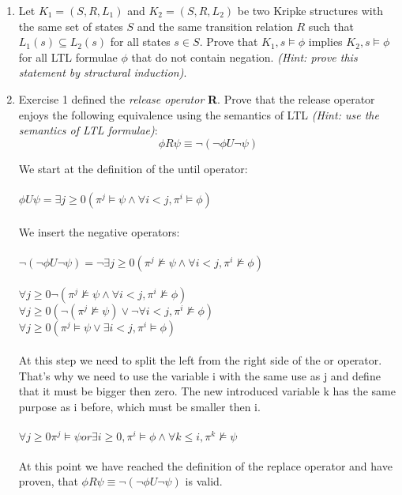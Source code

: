 
\begin{enumerate}

\item Let $K_1 = (S, R, L_1)$ and  $K_2 = (S, R, L_2)$ be two Kripke structures with the same set of states $S$ and the same transition relation $R$ such that $L_1(s) \subseteq L_2(s)$ for all states $s \in S$.
    Prove that $K_1,s \models \phi$ implies $K_2,s \models \phi$ for all LTL formulae $\phi$ that do not contain negation.
    \emph{(Hint: prove this statement by structural induction)}.

\item

Exercise 1 defined the \emph{release operator} \textbf{R}.
Prove that the release operator enjoys the following equivalence using the semantics of LTL \emph{(Hint: use the semantics of LTL formulae)}:
\begin{displaymath}
\phi R \psi \equiv \neg (\neg \phi U \neg \psi)
\end{displaymath}

We start at the definition of the until operator:\\
\\
$\phi U \psi = \exists j \geq 0 (\pi^{j} \vDash \psi \wedge \forall i<j, \pi^{i} \vDash \phi)$\\
\\
We insert the negative operators:\\
\\
$\neg (\neg \phi U \neg \psi) = \neg \exists j \geq 0 (\pi^{j} \nvDash \psi \wedge \forall i<j, \pi^{i} \nvDash \phi)$\\
\\
$\forall j \geq 0 \neg(\pi^{j} \nvDash \psi \wedge \forall i<j, \pi^{i} \nvDash \phi)$\\
$\forall j \geq 0 (\neg(\pi^{j} \nvDash \psi) \vee \neg\forall i<j, \pi^{i} \nvDash \phi)$\\
$\forall j \geq 0 (\pi^{j} \vDash \psi \vee \exists i<j, \pi^{i} \vDash \phi)$\\
\\
At this step we need to split the left from the right side of the or operator. That's why we need to use the variable i with the same use as j 
and define that it must be bigger then zero. The new introduced variable k has the same purpose as i before, which must be smaller then i.\\
\\
$\forall j \geq 0 \pi^{j} \vDash \psi 	or	 \exists i\geq 0, \pi^{i} \vDash \phi \wedge \forall k\leq i,\pi^{k} \nvDash \psi$\\
\\
At this point we have reached the definition of the replace operator and have proven, that $\phi R \psi \equiv \neg (\neg \phi U \neg \psi)$ is valid.



\end{enumerate}

